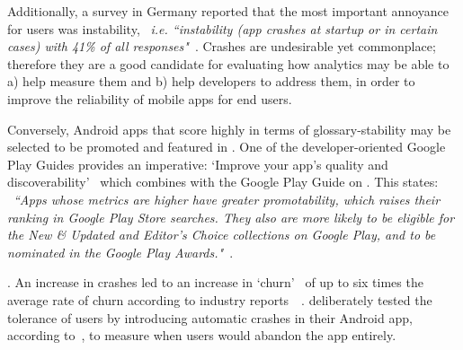 Additionally, a survey in Germany reported that the most important annoyance for users was instability, ~\emph{i.e. ``instability (app crashes at startup or in certain cases) with 41\% of all responses"}~.  %
%
Crashes are undesirable yet commonplace; therefore they are a good candidate for evaluating how analytics may be able to a) help measure them and b) help developers to address them, in order to improve the reliability of mobile apps for end users.

Conversely, Android apps that score highly in terms of \gls{glossary-stability} may be selected to be promoted and featured in . One of the developer-oriented Google Play Guides provides an imperative: `Improve your app’s quality and discoverability'~ which combines with the Google Play Guide on . This states: ~\emph{``Apps whose metrics are higher have greater promotability, which raises their ranking in Google Play Store searches. They also are more likely to be eligible for the New \& Updated and Editor's Choice collections on Google Play, and to be nominated in the Google Play Awards."}~. %

. An increase in crashes led to an increase in `churn'~ of up to six times the average rate of churn according to industry reports~~. 
 deliberately tested the tolerance of users by introducing automatic crashes in their Android app, according to~, to measure when users would abandon the app entirely. %

